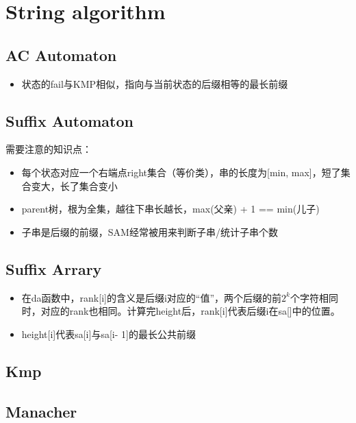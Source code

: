 \section{String algorithm}
	\subsection{AC Automaton}
		\begin{itemize}
			\item 状态的fail与KMP相似，指向与当前状态的后缀相等的最长前缀
		\end{itemize}
		
	\subsection{Suffix Automaton}
		\begin{flushleft}
			需要注意的知识点：
			\begin{itemize}
				\item 每个状态对应一个右端点right集合（等价类），串的长度为[min, max]，短了集合变大，长了集合变小
				\item parent树，根为全集，越往下串长越长，max(父亲) + 1 == min(儿子)
				\item 子串是后缀的前缀，SAM经常被用来判断子串/统计子串个数
			\end{itemize}
		\end{flushleft}
		
	\subsection{Suffix Arrary}
		\begin{flushleft}
			\begin{itemize}
				\item 在da函数中，rank[i]的含义是后缀i对应的“值”，两个后缀的前$2^k$个字符相同时，对应的rank也相同。计算完height后，rank[i]代表后缀i在sa[]中的位置。
				\item height[i]代表sa[i]与sa[i- 1]的最长公共前缀
			\end{itemize}
		\end{flushleft}
		
	\subsection{Kmp}
		
	\subsection{Manacher}
		
